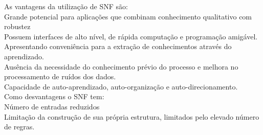 \documentclass[a4paper,oneside,12pt]{article}
\begin{document}
As vantagens da utiliza\c{c}\~ao de SNF s\~ao:\\
Grande potencial para aplica\c{c}\~oes que combinam conhecimento qualitativo com robustez \\
Possuem interfaces de alto n\'ivel, de r\'apida computa\c{c}\~ao e programa\c{c}\~ao amig\'avel. Apresentando conveni\^encia para a extra\c{c}\~ao de conhecimentos atrav\'es do aprendizado. \\
Aus\^encia da necessidade do conhecimento pr\'evio do processo e melhora no processamento de ru\'idos dos dados. \\
Capacidade de auto-aprendizado, auto-organiza\c{c}\~ao e auto-direcionamento. \\

Como desvantagens o SNF tem: \\
N\'umero de entradas reduzidos \\
Limita\c{c}\~ao da constru\c{c}\~ao de sua pr\'opria estrutura, limitados pelo elevado n\'umero de regras. \\
\end{document}
